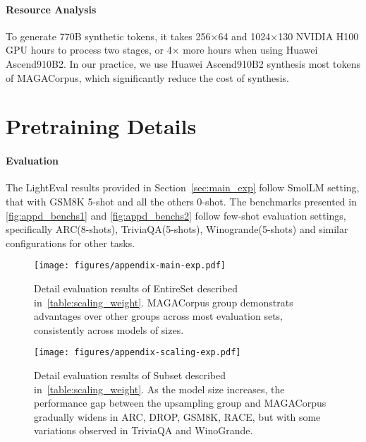 \paragraph{Resource Analysis}
To generate 770B synthetic tokens, it takes 256×64 and 1024×130 NVIDIA H100 GPU hours to process two stages, or 4× more hours when using Huawei Ascend910B2. 
In our practice, we use Huawei Ascend910B2 synthesis most tokens of MAGACorpus, which significantly reduce the cost of synthesis.

\section{Pretraining Details}
\label{sec:appd_training}

\paragraph{Evaluation}
The LightEval results provided in Section~\ref{sec:main_exp} follow SmolLM setting, that with GSM8K 5-shot and all the others 0-shot.
The benchmarks presented in \autoref{fig:appd_benchs1} and \autoref{fig:appd_benchs2} follow few-shot evaluation settings, specifically ARC(8-shots), TriviaQA(5-shots), Winogrande(5-shots) 
and similar configurations for other tasks.


\begin{figure*}[htb!]
    \centering    
    \texttt{[image: figures/appendix-main-exp.pdf]}
    \vspace{-2em}
    \caption{Detail evaluation results of EntireSet described in~\autoref{table:scaling_weight}. MAGACorpus group demonstrats advantages over other groups across most evaluation sets, consistently across models of sizes. }
    \label{fig:appd_benchs1}
\end{figure*}


\begin{figure*}[htb!]
    \centering
    \vspace{-1em}
    \texttt{[image: figures/appendix-scaling-exp.pdf]}
    \vspace{-2em}
    \caption{Detail evaluation results of Subset described in~\autoref{table:scaling_weight}. As the model size increases, the performance gap between the upsampling group and MAGACorpus gradually widens in ARC, DROP, GSM8K, RACE, but with some variations observed in TriviaQA and WinoGrande.}
    \label{fig:appd_benchs2}
\end{figure*}



